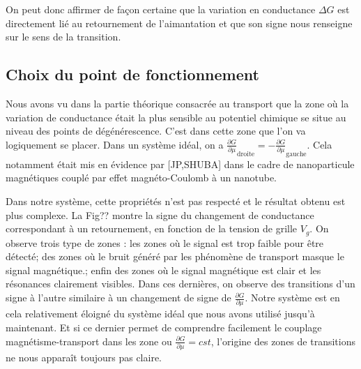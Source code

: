 On peut donc affirmer de façon certaine que la variation en conductance $\Delta G$ est directement lié au retournement de l'aimantation et que son signe nous renseigne sur le sens de la transition.

\subsection{Choix du point de fonctionnement}
Nous avons vu dans la partie théorique consacrée au transport que la zone où la variation de conductance était la plus sensible au potentiel chimique se situe au niveau des points de dégénérescence. C'est dans cette zone que l'on va logiquement se placer. Dans un système idéal, on a $\frac{\partial G}{\partial \mu}_{\text{droite}} = -\frac{\partial G}{\partial \mu}_{\text{gauche}} $. Cela notamment était mis en évidence par [JP,SHUBA] dans le cadre de nanoparticule magnétiques couplé par effet magnéto-Coulomb à un nanotube.

Dans notre système, cette propriétés n'est pas respecté et le résultat obtenu est plus complexe. La Fig?? montre la signe du changement de conductance correspondant à un retournement, en fonction de la tension de grille $V_g$. On observe trois type de zones : les zones où le signal est trop faible pour être détecté; des zones où le bruit généré par les phénomène de transport masque le signal magnétique.; enfin des zones où le signal magnétique est clair et les résonances clairement visibles. Dans ces dernières, on observe des transitions d'un signe à l'autre similaire à un changement de signe de $\frac{\partial G}{\partial \mu}$. Notre système est en cela relativement éloigné du système idéal que nous avons utilisé jusqu'à maintenant. Et si ce dernier permet de comprendre facilement le couplage magnétisme-transport dans les zone ou $\frac{\partial G}{\partial \mu} = cst$, l'origine des zones de transitions ne nous apparaît toujours pas claire.